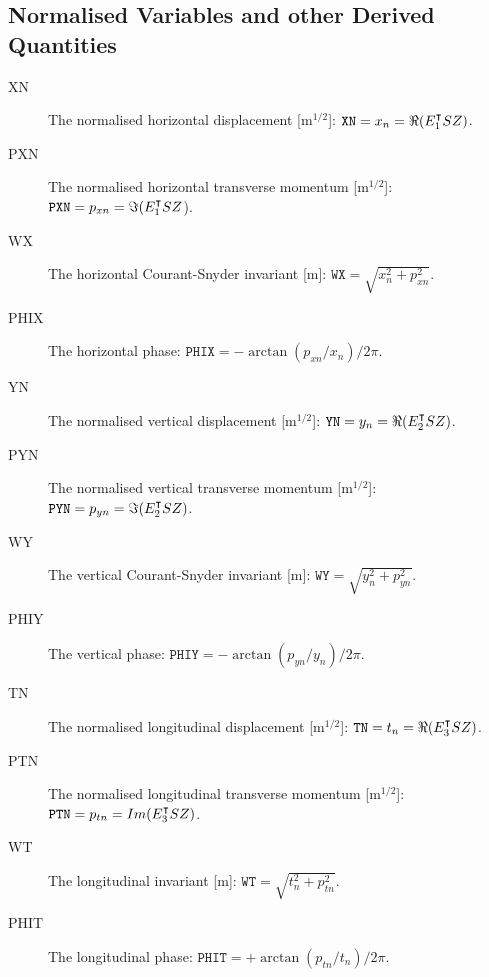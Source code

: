 \subsection{Normalised Variables and other Derived Quantities}
\label{sec:normal}
\begin{description}
\item[XN]
  The normalised horizontal displacement [$\mathrm{m}^{1/2}$]:
  $\mathtt{XN} = x_n = \Re(E_1^\intercal S Z)$.

\item[PXN]
  The normalised horizontal transverse momentum [$\mathrm{m}^{1/2}$]:
  $\mathtt{PXN} = p_{xn} = \Im(E_1^\intercal S Z$).

\item[WX]
  The horizontal Courant-Snyder invariant [m]:
  $\mathtt{WX} = \sqrt{x_n^2 + p_{xn}^2}$.

\item[PHIX]
  The horizontal phase:
  $\mathtt{PHIX} = - \arctan(p_{xn} / x_n) / 2 \pi$.

\item[YN]
  The normalised vertical displacement [$\mathrm{m}^{1/2}$]:
  $\mathtt{YN} = y_n = \Re(E_2^\intercal S Z)$.

\item[PYN]
  The normalised vertical transverse momentum [$\mathrm{m}^{1/2}$]:
  $\mathtt{PYN} = p_{yn} = \Im(E_2^\intercal S Z)$.

\item[WY]
  The vertical Courant-Snyder invariant [m]:
  $\mathtt{WY} = \sqrt{y_n^2 + p_{yn}^2}$.

\item[PHIY]
  The vertical phase:
  $\mathtt{PHIY} = - \arctan(p_{yn} / y_n) / 2 \pi$.

\item[TN]
  The normalised longitudinal displacement [$\mathrm{m}^{1/2}$]:
  $\mathtt{TN} = t_n = \Re(E_3^\intercal S Z)$.

\item[PTN]
  The normalised longitudinal transverse momentum [$\mathrm{m}^{1/2}$]:
  $\mathtt{PTN} = p_{tn} = Im(E_3^\intercal S Z)$.

\item[WT]
  The longitudinal invariant [m]:
  $\mathtt{WT} = \sqrt{t_n^2 + p_{tn}^2}$.

\item[PHIT]
  The longitudinal phase:
  $\mathtt{PHIT} = + \arctan(p_{tn} / t_n) / 2 \pi$.

\end{description}
